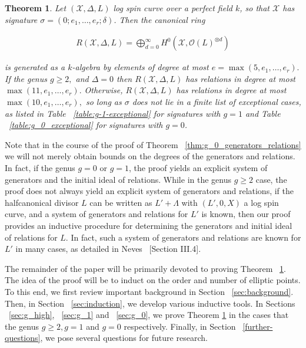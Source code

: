 \documentclass{amsart}
\theoremstyle{plain}
\newtheorem{thm}{Theorem}[section]
\theoremstyle{definition}
\theoremstyle{remark}
\numberwithin{equation}{section}
\newcommand \sx{\mathscr X}
\newcommand\sco{{\mathscr O}}
\newcommand \halfcan{L}
\begin{document}
\begin{thm}
\label{thm:general_generators_relations}
Let $(\sx, \Delta, \halfcan)$ log spin curve over a perfect field $k$, so
that $\sx$ has signature $\sigma = (0; e_1, \ldots, e_r; \delta)$. Then the
canonical ring

\begin{align*}
	R(\sx, \Delta, \halfcan) = \bigoplus_{d = 0}^\infty H^0(\sx, \sco(L)^{\otimes d})
\end{align*}

\noindent
is generated as a $k$-algebra by elements of degree at most $e =
\max(5, e_1, \ldots, e_r).$ If the genus $g \geq 2,$ and $\Delta = 0$ then 
$R(\sx,\Delta, \halfcan)$ has relations in degree at most $\max(11, e_1,
\ldots, e_r).$ Otherwise, $R(\sx, \Delta, \halfcan)$ has relations in degree at most
$\max(10, e_1, \ldots, e_r),$ so long as $\sigma$ does not lie in a finite list of
exceptional cases, as listed in Table ~\ref{table:g-1-exceptional}
for signatures with $g = 1$ and Table ~\ref{table:g_0_exceptional}
for signatures with $g = 0$.
\end{thm}
Note that in the course of the proof of Theorem ~\ref{thm:g_0_generators_relations} we will not merely obtain bounds on the degrees of the generators and relations. In fact, if the genus $g = 0$ or $g = 1$, the proof yields an explicit system of generators and the initial ideal of relations. While in the genus $g \geq 2$ case, the proof does not always yield an explicit system of generators and relations, if the halfcanonical divisor $\halfcan$ can be written as $\halfcan' + \Lambda$ with $(\halfcan',0,X)$ a log spin curve, and a system of generators and relations for $\halfcan'$ is known, then our proof provides an inductive procedure for determining the generators and initial ideal of relations for $\halfcan$. In fact, such a system of generators and relations are known for $\halfcan'$ in many cases, as detailed in Neves ~\cite{neves:halfcan}[Section III.4].

The remainder of the paper will be primarily devoted to proving Theorem ~\ref{thm:general_generators_relations}. The idea of the proof will be to induct on the order and number of elliptic points. To this end, we first review important background in Section ~\ref{sec:background}. Then, in Section ~\ref{sec:induction}, we develop various inductive tools. In Sections ~\ref{sec:g_high}, ~\ref{sec:g_1} and ~\ref{sec:g_0}, we prove Theorem \ref{thm:general_generators_relations} in the cases that the genus $g \geq 2, g = 1$ and $g = 0$ respectively. Finally, in Section ~\ref{further-questions}, we pose several questions for future research.
\end{document}
